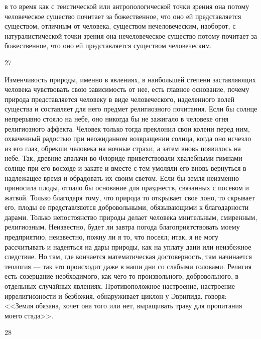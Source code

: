 \documentclass[12pt]{article}
\begin{document}
в то время как с теистической или антропологической точки зрения она потому человеческое существо почитает за божественное, что оно ей представляется существом, отличным от человека, существом нечеловеческим, наоборот, с натуралистической точки зрения она нечеловеческое существо потому почитает за божественное, что оно ей представляется существом человеческим.



27

Изменчивость природы, именно в явлениях, в наибольшей степени заставляющих человека чувствовать свою зависимость от нее, есть главное основание, почему природа представляется человеку в виде человеческого, наделенного волей существа и составляет для него предмет религиозного почитания. Если бы солнце непрерывно стояло на небе, оно никогда бы не зажигало в человеке огня религиозного аффекта. Человек только тогда преклонил свои колени перед ним, охваченный радостью при неожиданном возвращении солнца, когда оно исчезло из его глаз, обрекши человека на ночные страхи, а затем вновь появилось на небе. Так, древние апалачи во Флориде приветствовали хвалебными гимнами солнце при его восходе и закате и вместе с тем умоляли его вновь вернуться в надлежащее время и обрадовать их своим светом. Если бы земля неизменно приносила плоды, отпало бы основание для празднеств, связанных с посевом и жатвой. Только благодаря тому, что природа то открывает свое лоно, то скрывает его, плоды ее представляются добровольными, обязывающими к благодарности дарами. Только непостоянство природы делает человека мнительным, смиренным, религиозным. Неизвестно, будет ли завтра погода благоприятствовать моему предприятию, неизвестно, пожну ли я то, что посеял; итак, я не могу рассчитывать и надеяться на дары природы, как на уплату дани или неизбежное следствие. Но там, где кончается математическая достоверность, там начинается теология --- так это происходит даже в наши дни со слабыми головами. Религия есть созерцание необходимого, как чего-то произвольного, добровольного, в отдельных случайных явлениях. Противоположное настроение, настроение иррелигиозности и безбожия, обнаруживает циклон у Эврипида, говоря: <<Земля обязана, хочет она того или нет, выращивать траву для пропитания моего стада>>.



28
\end{document}
